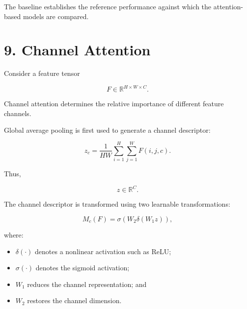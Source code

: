 \documentclass[10pt]{article}
\begin{document}
\begin{center}


\end{center}

The baseline establishes the reference performance against which the
attention-based models are compared.

\section*{9. Channel Attention}

Consider a feature tensor

\[
F\in\mathbb{R}^{H\times W\times C}.
\]

Channel attention determines the relative importance of different feature
channels.

Global average pooling is first used to generate a channel descriptor:

\[
z_c
=
\frac{1}{HW}
\sum_{i=1}^{H}
\sum_{j=1}^{W}
F(i,j,c).
\]

Thus,

\[
z\in\mathbb{R}^{C}.
\]

The channel descriptor is transformed using two learnable transformations:

\[
M_c(F)
=
\sigma
\left(
W_2
\delta
\left(
W_1z
\right)
\right),
\]

where:

\begin{itemize}

\item $\delta(\cdot)$ denotes a nonlinear activation such as ReLU;

\item $\sigma(\cdot)$ denotes the sigmoid activation;

\item $W_1$ reduces the channel representation; and

\item $W_2$ restores the channel dimension.

\end{itemize}
\end{document}

